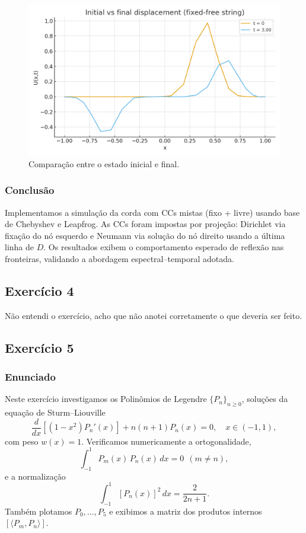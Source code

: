 \documentclass[12pt,a4paper]{article}
\begin{document}
\begin{figure}[H]
  \centering
  \includegraphics[width=0.75\linewidth]{figures/wave_fixed_free_snapshots.png}
  \caption{Comparação entre o estado inicial e final.}
  \label{fig:snapshots_fixed_free}
\end{figure}

\subsubsection{Conclusão}
Implementamos a simulação da corda com CCs mistas (fixo + livre) usando base de Chebyshev e Leapfrog.
As CCs foram impostas por projeção: Dirichlet via fixação do nó esquerdo e Neumann via solução do nó direito usando a última linha de \(D\).
Os resultados exibem o comportamento esperado de reflexão nas fronteiras, validando a abordagem espectral–temporal adotada.

\newpage

\subsection{Exercício 4}

Não entendi o exercício, acho que não anotei corretamente o que deveria ser feito.

\subsection{Exercício 5}

\subsubsection{Enunciado}
Neste exercício investigamos os Polinômios de Legendre \( \{P_n\}_{n\ge 0} \), soluções da equação de Sturm--Liouville
\[
\frac{d}{dx}\!\left[(1-x^2)P_n'(x)\right] + n(n+1)P_n(x) = 0,\quad x\in(-1,1),
\]
com peso \(w(x)=1\). Verificamos numericamente a ortogonalidade,
\[
\int_{-1}^{1} P_m(x)\,P_n(x)\,dx = 0 \ \ (m\neq n),
\]
e a normalização
\[
\int_{-1}^{1} [P_n(x)]^2\,dx = \frac{2}{2n+1}.
\]
Também plotamos \(P_0,\dots,P_5\) e exibimos a matriz dos produtos internos \([\langle P_m,P_n\rangle]\).
\end{document}

